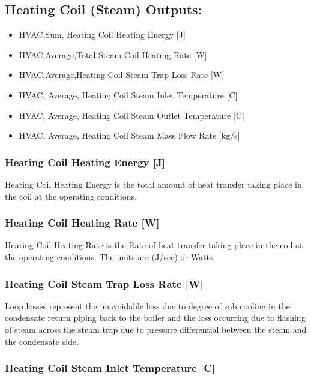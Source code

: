 \subsection{Heating Coil (Steam) Outputs:}\label{heating-coil-steam-outputs}

\begin{itemize}
\item
  HVAC,Sum, Heating Coil Heating Energy {[}J{]}
\item
  HVAC,Average,Total Steam Coil Heating Rate {[}W{]}
\item
  HVAC,Average,Heating Coil Steam Trap Loss Rate {[}W{]}
\item
  HVAC, Average, Heating Coil Steam Inlet Temperature {[}C{]}
\item
  HVAC, Average, Heating Coil Steam Outlet Temperature {[}C{]}
\item
  HVAC, Average, Heating Coil Steam Mass Flow Rate {[}kg/s{]}
\end{itemize}

\subsubsection{Heating Coil Heating Energy {[}J{]}}\label{heating-coil-heating-energy-j-1}

Heating Coil Heating Energy is the total amount of heat transfer taking place in the coil at the operating conditions.

\subsubsection{Heating Coil Heating Rate {[}W{]}}\label{heating-coil-heating-rate-w-1}

Heating Coil Heating Rate is the Rate of heat transfer taking place in the coil at the operating conditions. The units are (J/sec) or Watts.

\subsubsection{Heating Coil Steam Trap Loss Rate {[}W{]}}\label{heating-coil-steam-trap-loss-rate-w}

Loop losses represent the unavoidable loss due to degree of sub cooling in the condensate return piping back to the boiler and the loss occurring due to flashing of steam across the steam trap due to pressure differential between the steam and the condensate side.

\subsubsection{Heating Coil Steam Inlet Temperature {[}C{]}}\label{heating-coil-steam-inlet-temperature-c}

